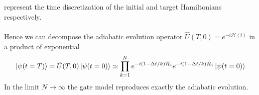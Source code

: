 represent the time discretization of the initial and target Hamiltonians respectively. \\\\
Hence we can decompose the adiabatic evolution operator $\hat{U}(T,0) = e^{-i\mathcal{H}(t)}$ in a product of exponential
\begin{equation}
    \ket{\psi(t = T)} = \hat{U}(T,0)\ket{\psi(t = 0)} \simeq \prod_{k=1}^{N}e^{-i\left(1-\Delta t/k\right)\hat{\mathcal{H}}_{i}}e^{-i\left(1-\Delta t/k\right)\hat{\mathcal{H}}_{i}}\ket{\psi(t = 0)} 
\end{equation}
In the limit $N \rightarrow \infty$ the gate model reproduces exactly the adiabatic evolution.
